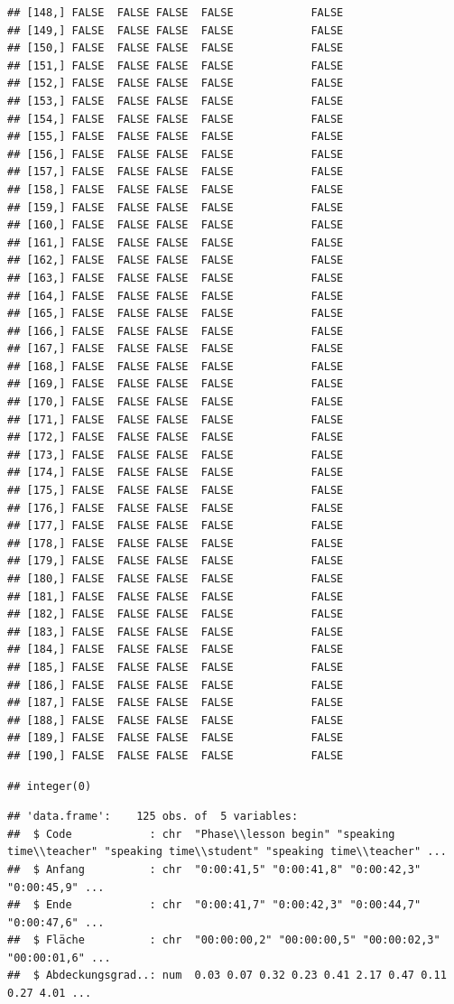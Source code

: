 \documentclass[
  english,
  man,floatsintext]{apa6}
\begin{document}
\begin{verbatim}
## [148,] FALSE  FALSE FALSE  FALSE            FALSE
## [149,] FALSE  FALSE FALSE  FALSE            FALSE
## [150,] FALSE  FALSE FALSE  FALSE            FALSE
## [151,] FALSE  FALSE FALSE  FALSE            FALSE
## [152,] FALSE  FALSE FALSE  FALSE            FALSE
## [153,] FALSE  FALSE FALSE  FALSE            FALSE
## [154,] FALSE  FALSE FALSE  FALSE            FALSE
## [155,] FALSE  FALSE FALSE  FALSE            FALSE
## [156,] FALSE  FALSE FALSE  FALSE            FALSE
## [157,] FALSE  FALSE FALSE  FALSE            FALSE
## [158,] FALSE  FALSE FALSE  FALSE            FALSE
## [159,] FALSE  FALSE FALSE  FALSE            FALSE
## [160,] FALSE  FALSE FALSE  FALSE            FALSE
## [161,] FALSE  FALSE FALSE  FALSE            FALSE
## [162,] FALSE  FALSE FALSE  FALSE            FALSE
## [163,] FALSE  FALSE FALSE  FALSE            FALSE
## [164,] FALSE  FALSE FALSE  FALSE            FALSE
## [165,] FALSE  FALSE FALSE  FALSE            FALSE
## [166,] FALSE  FALSE FALSE  FALSE            FALSE
## [167,] FALSE  FALSE FALSE  FALSE            FALSE
## [168,] FALSE  FALSE FALSE  FALSE            FALSE
## [169,] FALSE  FALSE FALSE  FALSE            FALSE
## [170,] FALSE  FALSE FALSE  FALSE            FALSE
## [171,] FALSE  FALSE FALSE  FALSE            FALSE
## [172,] FALSE  FALSE FALSE  FALSE            FALSE
## [173,] FALSE  FALSE FALSE  FALSE            FALSE
## [174,] FALSE  FALSE FALSE  FALSE            FALSE
## [175,] FALSE  FALSE FALSE  FALSE            FALSE
## [176,] FALSE  FALSE FALSE  FALSE            FALSE
## [177,] FALSE  FALSE FALSE  FALSE            FALSE
## [178,] FALSE  FALSE FALSE  FALSE            FALSE
## [179,] FALSE  FALSE FALSE  FALSE            FALSE
## [180,] FALSE  FALSE FALSE  FALSE            FALSE
## [181,] FALSE  FALSE FALSE  FALSE            FALSE
## [182,] FALSE  FALSE FALSE  FALSE            FALSE
## [183,] FALSE  FALSE FALSE  FALSE            FALSE
## [184,] FALSE  FALSE FALSE  FALSE            FALSE
## [185,] FALSE  FALSE FALSE  FALSE            FALSE
## [186,] FALSE  FALSE FALSE  FALSE            FALSE
## [187,] FALSE  FALSE FALSE  FALSE            FALSE
## [188,] FALSE  FALSE FALSE  FALSE            FALSE
## [189,] FALSE  FALSE FALSE  FALSE            FALSE
## [190,] FALSE  FALSE FALSE  FALSE            FALSE
\end{verbatim}

\begin{verbatim}
## integer(0)
\end{verbatim}

\begin{verbatim}
## 'data.frame':    125 obs. of  5 variables:
##  $ Code            : chr  "Phase\\lesson begin" "speaking time\\teacher" "speaking time\\student" "speaking time\\teacher" ...
##  $ Anfang          : chr  "0:00:41,5" "0:00:41,8" "0:00:42,3" "0:00:45,9" ...
##  $ Ende            : chr  "0:00:41,7" "0:00:42,3" "0:00:44,7" "0:00:47,6" ...
##  $ Fläche          : chr  "00:00:00,2" "00:00:00,5" "00:00:02,3" "00:00:01,6" ...
##  $ Abdeckungsgrad..: num  0.03 0.07 0.32 0.23 0.41 2.17 0.47 0.11 0.27 4.01 ...
\end{verbatim}
\end{document}

